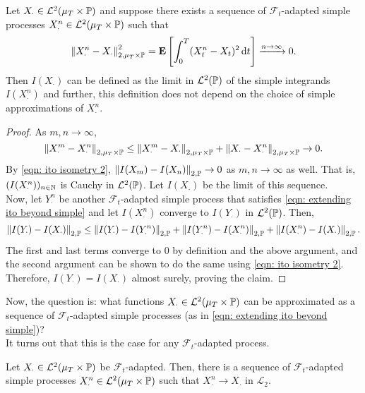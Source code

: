 \begin{lemma}
	Let $X_\cdot \in \mathcal{L}^2(\mu_T\times\mathbb{P})$ and suppose there exists a sequence of $\mathcal{F}_t$-adapted simple processes $X_\cdot^n \in \mathcal{L}^2(\mu_T\times\mathbb{P})$ such that
	\begin{equation}
		\label{eqn: extending ito beyond simple}
		\left\lVert X_\cdot^n - X_\cdot\right\rVert_{2,\mu_T\times\mathbb{P}}^2 = \textbf{E}\left[\int_0^T (X_t^n - X_t)^2 \operatorname{d}\!{t} \right] \xrightarrow[]{n\to\infty} 0.
	\end{equation}
	Then $I(X_\cdot)$ can be defined as the limit in $\mathcal{L}^2(\mathbb{P})$ of the simple integrands $I(X^n_\cdot)$ and further, this definition does not depend on the choice of simple approximations of $X_\cdot^n$.
\end{lemma}
\begin{proof}
	As $m,n\to\infty$,
	\[ \left\lVert X_\cdot^m - X_\cdot^n\right\rVert_{2,\mu_T\times\mathbb{P}} \leq \left\lVert X_\cdot^m - X_\cdot\right\rVert_{2,\mu_T\times\mathbb{P}} + \left\lVert X_\cdot - X_\cdot^n\right\rVert_{2,\mu_T\times\mathbb{P}} \to 0. \]
	By \eqref{eqn: ito isometry 2}, $\left\lVert I(X_m) - I(X_n)\right\rVert_{2,\mathbb{P}}\to 0$ as $m,n\to\infty$ as well. That is, $(I(X_\cdot^n))_{n \in \mathbb{N}}$ is Cauchy in $\mathcal{L}^2(\mathbb{P})$. Let $I(X_\cdot)$ be the limit of this sequence.\\
	Now, let $Y_\cdot^n$ be another $\mathcal{F}_t$-adapted simple process that satisfies \eqref{eqn: extending ito beyond simple} and let $I(X_\cdot^n)$ converge to $I(Y_\cdot)$ in $\mathcal{L}^2(\mathbb{P})$. Then,
	\[ \left\lVert I(Y_\cdot) - I(X_\cdot)\right\rVert_{2,\mathbb{P}} \leq \left\lVert I(Y_\cdot) - I(Y_\cdot^n)\right\rVert_{2,\mathbb{P}} + \left\lVert I(Y_\cdot^n) - I(X_\cdot^n)\right\rVert_{2,\mathbb{P}} + \left\lVert I(X_\cdot^n) - I(X_\cdot)\right\rVert_{2,\mathbb{P}}. \]
	The first and last terms converge to $0$ by definition and the above argument, and the second argument can be shown to do the same using \eqref{eqn: ito isometry 2}.\\
	Therefore, $I(Y_\cdot) = I(X_\cdot)$ almost surely, proving the claim.
\end{proof}

Now, the question is: what functions $X_\cdot\in\mathcal{L}^2(\mu_T\times\mathbb{P})$ can be approximated as a sequence of $\mathcal{F}_t$-adapted simple processes (as in \eqref{eqn: extending ito beyond simple})?\\
It turns out that this is the case for any $\mathcal{F}_t$-adapted process.

\begin{lemma}
	Let $X_\cdot\in\mathcal{L}^2(\mu_T\times\mathbb{P})$ be $\mathcal{F}_t$-adapted. Then, there is a sequence of $\mathcal{F}_t$-adapted simple processes $X_\cdot^n\in\mathcal{L}^2(\mu_T\times\mathbb{P})$ such that $X^n_\cdot \to X_\cdot$ in $\mathcal{L}_2$.
\end{lemma}

